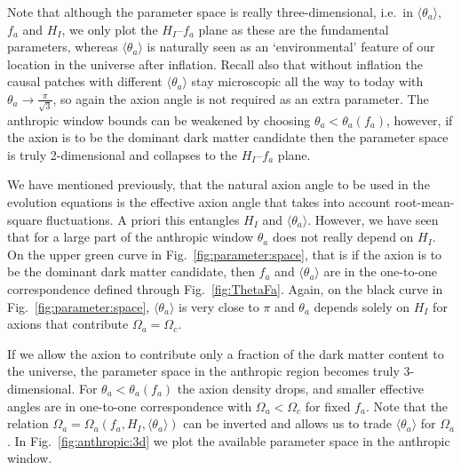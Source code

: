 \documentclass[preprint,nofootinbib]{revtex4}
\newcommand{\reffig}[1]{Fig.~\ref{#1}}
\begin{document}
Note that although the parameter space is really three-dimensional, i.e.\ in $\langle \theta_a \rangle$, $f_a$ and $H_I$, we only plot the $H_I$--$f_a$ plane as these are the fundamental parameters, whereas $\langle \theta_a \rangle$ is naturally seen as an `environmental' feature of our location in the universe after inflation. Recall also that without inflation the causal patches with different $\langle \theta_a \rangle$ stay microscopic all the way to today with $\theta_a \to \frac{\pi}{\sqrt{3}}$, so again the axion angle is not required as an extra parameter. The anthropic window bounds can be weakened by choosing $\theta_a<\theta_a(f_a)$, however, if the axion is to be the dominant dark matter candidate then the parameter space is truly 2-dimensional and collapses to the $H_I$--$f_a$ plane.

We have mentioned previously, that the natural axion angle to be used in the evolution equations is the effective axion angle that takes into account root-mean-square fluctuations. A priori this entangles $H_I$ and $\langle \theta_a \rangle$. However, we have seen that for a large part of the anthropic window $\theta_a$ does not really depend on $H_I$. On the upper green curve in \reffig{fig:parameter:space}, that is if the axion is to be the dominant dark matter candidate, then $f_a$ and $\langle \theta_a \rangle$ are in the one-to-one correspondence defined through \reffig{fig:ThetaFa}. Again, on the black curve in \reffig{fig:parameter:space}, $\langle \theta_a \rangle$ is very close to $\pi$ and $\theta_a$ depends solely on $H_I$ for axions that contribute $\Omega_a=\Omega_c$.

If we allow the axion to contribute only a fraction of the dark matter content to the universe, the parameter space in the anthropic region becomes truly 3-dimensional. For $\theta_a<\theta_a(f_a)$ the axion density drops, and smaller effective angles are in one-to-one correspondence with $\Omega_a<\Omega_c$ for fixed $f_a$. Note that the relation $\Omega_a=\Omega_a(f_a,H_I,\langle \theta_a \rangle)$ can be inverted and allows us to trade $\langle \theta_a \rangle$ for $\Omega_a$. In \reffig{fig:anthropic:3d} we plot the available parameter space in the anthropic window.
\end{document}
